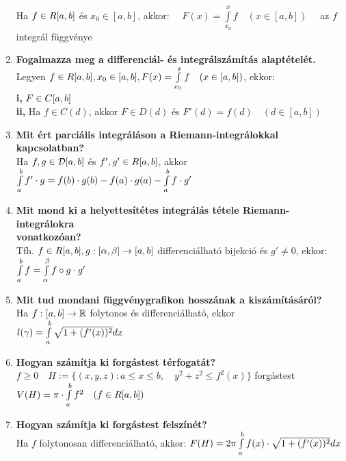 \documentclass[a4paper,11pt]{article}
\begin{document}
\begin{enumerate}
	Ha $f\in R[a,b]$ és $x_0\in[a,b]$, akkor:
	$\quad F(x)=\int\limits_{x_0}^xf\quad(x\in[a,b])\quad$ az $f$ integrál függvénye
	\item\textbf{Fogalmazza meg a differenciál- és integrálszámítás alaptételét.}
	\\[0.1cm]
	Legyen $f\in R[a,b],x_0\in[a,b],F(x)=\int\limits_{x_0}^xf\quad(x\in[a,b])$, ekkor:
	\\\textbf{i,} $F\in C[a,b]$\\[0.2cm]
	\textbf{ii,} Ha $f\in C(d)$, akkor $F\in D(d)$ és $F'(d)=f(d)\quad(d\in[a,b])$
	\item\textbf{Mit ért parciális integráláson a Riemann-integrálokkal kapcsolatban?}
	\\[0.1cm]
	Ha $f,g\in\mathcal{D}[a,b]$ és $f',g'\in R[a,b]$, akkor $\int\limits_{a}^{b} f'\cdot g=f(b)\cdot g(b)-
	f(a)\cdot g(a)-\int\limits_{a}^{b} f\cdot g'$
	\item\textbf{Mit mond ki a helyettesítétes integrálás tétele Riemann-integrálokra \\ vonatkozóan?}\\[0.1cm]
	Tfh. $f\in R[a,b],g:[\alpha,\beta]\to[a,b]$ differenciálható bijekció és $g'\neq0$,
	ekkor: $\int\limits_{a}^{b} f=\int\limits_{\alpha}^{\beta}f\circ g\cdot g'$
	\item\textbf{Mit tud mondani függvénygrafikon hosszának a kiszámításáról?}\\[0.1cm]
	Ha $f:[a,b]\to\mathbb{R}$ folytonos és differenciálható, ekkor $l(\gamma)=
	\int\limits_{a}^{b}\sqrt{1+(f'(x))^2}dx$
	\item\textbf{Hogyan számítja ki forgástest térfogatát?}\\[0.1cm]
	$f\geq0\quad H:=\{(x,y,z):a\leq x\leq b,\quad y^2+z^2\leq f^2(x)\}$
	forgástest\\$V(H)=\pi\cdot\int\limits_{a}^{b} f^2\quad(f\in R[a,b])$
	\item\textbf{Hogyan számítja ki forgástest felszínét?}\\[0.1cm]
	Ha $f$ folytonosan differenciálható, akkor:
	$F(H)=2\pi\int\limits_{a}^{b} f(x)\cdot\sqrt{1+(f'(x))^2}dx$
\end{enumerate}
\end{document}
